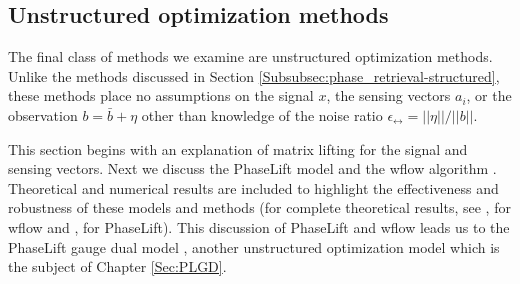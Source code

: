 \subsection{Unstructured optimization methods}	 	\label{Subsubsec:phase_retrieval-unstructured}


The final class of methods we examine are unstructured optimization methods.  Unlike the methods discussed in Section \ref{Subsubsec:phase_retrieval-structured}, these methods place no assumptions on the signal $x$, the sensing vectors $a_i$, or the observation $b = \bar{b} + \eta$ other than knowledge of the noise ratio $\epsilon_\rel = ||\eta|| / ||b||$.

This section begins with an explanation of matrix lifting for the signal and sensing vectors.  Next we discuss the PhaseLift model \cite{DBLP:journals/siamis/CandesESV13} and the wflow algorithm \cite{DBLP:journals/tit/CandesLS15}.   Theoretical and numerical results are included to highlight the effectiveness and robustness of these models and methods (for complete theoretical results, see \cite{DBLP:journals/tit/CandesLS15},  \cite{sun2016geometric} for wflow and \cite{candes2014solving}, \cite{candes2013phaselift} for PhaseLift).  This discussion of PhaseLift and wflow leads us to the PhaseLift gauge dual model \cite{DBLP:journals/siamsc/FriedlanderM16}, another unstructured optimization model which is the subject of Chapter \ref{Sec:PLGD}.






